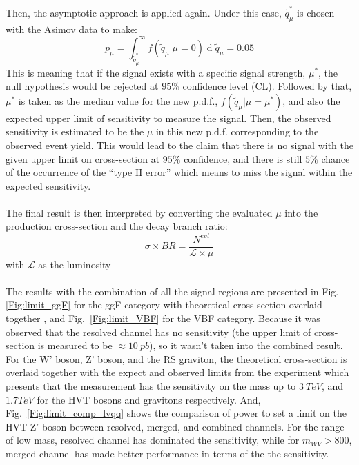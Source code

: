 \\
\\Then, the asymptotic approach is applied again. Under this case, $\tilde{q}_{\mu}^{*}$ is chosen with the Asimov data to make:
\begin{equation}
p_{\mu}=\int_{\tilde{q}_{\mu}^{*}}^{\infty}f(\tilde{q}_{\mu}|\mu=0)\operatorname{d}\tilde{q}_{\mu}=0.05
\end{equation}
\noindent
This is meaning that if the signal exists with a specific signal strength, $\mu^*$, the null hypothesis would be rejected at $95\%$ confidence level (CL). Followed by that, $\mu^*$ is taken as the median value for the new p.d.f., $f(\tilde{q}_{\mu}|\mu=\mu^*)$, and also the expected upper limit of sensitivity to measure the signal. Then, the observed sensitivity is estimated to be the $\mu$ in this new p.d.f. corresponding to the observed event yield. This would lead to the claim that there is no signal with the given upper limit on cross-section at $95\%$ confidence, and there is still $5\%$ chance of the occurrence of the ``type II error'' which means to miss the signal within the expected sensitivity. 
\\
\\The final result is then interpreted by converting the evaluated $\mu$ into the production cross-section and the decay branch ratio:
\begin{equation}
\sigma\times BR=\frac{N^{evt}}{\mathcal{L}\times\mu}
\end{equation}  
with $\mathcal{L}$ as the luminosity
\\
\\The results with the combination of all the signal regions are presented in Fig.~ \ref{Fig:limit_ggF} for the ggF category with theoretical cross-section overlaid together , and Fig.~\ref{Fig:limit_VBF} for the VBF category. Because it was observed that the resolved channel has no sensitivity (the upper limit of cross-section is measured to be $\approx10~pb$), so it wasn't taken into the combined result. For the W' boson, Z' boson, and the RS graviton, the theoretical cross-section is overlaid together with the expect and observed limits from the experiment which presents that the measurement has the sensitivity on the mass up to $3~TeV$, and $1.7TeV$ for the HVT bosons and gravitons respectively. And, Fig.~\ref{Fig:limit_comp_lvqq} shows the comparison of power to set a limit on the HVT Z' boson between resolved, merged, and combined channels. For the range of low mass, resolved channel has dominated the sensitivity, while for $m_{WV}>800$, merged channel has made better performance in terms of the the sensitivity.

